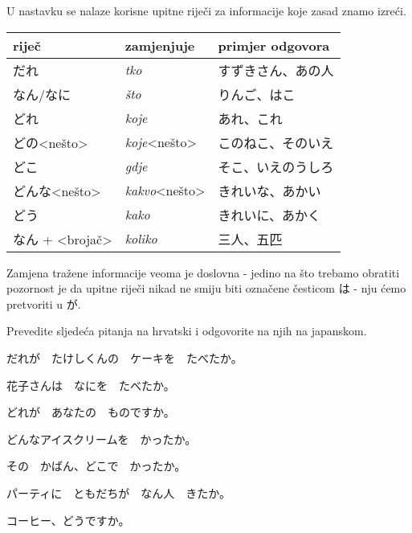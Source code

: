 	U nastavku se nalaze korisne upitne riječi za informacije koje zasad znamo izreći.
	
	\vspace{10pt}
	\begin{table}[h]
		\centering
		\begin{tabular}{l l l}\toprule[2pt]
			riječ & zamjenjuje & primjer odgovora\\
			\midrule
			だれ & \textit{tko} & すずきさん、あの人\\
			なん/なに & \textit{što} & りんご、はこ\\
			どれ & \textit{koje} & あれ、これ\\
			どの<nešto> & \textit{koje}<nešto> & このねこ、そのいえ\\
			どこ & \textit{gdje} & そこ、いえのうしろ\\
			どんな<nešto> & \textit{kakvo}<nešto> & きれいな、あかい\\
			どう & \textit{kako} & きれいに、あかく\\
			なん + <brojač> & \textit{koliko} & 三人、五匹\\
			\bottomrule
		\end{tabular}
	\end{table}

	\vspace{5pt}
	Zamjena tražene informacije veoma je doslovna - jedino na što trebamo obratiti pozornost je da upitne riječi nikad ne smiju biti označene česticom は - nju ćemo pretvoriti u が.

	
	\begin{mondai}{Prevedite sljedeća pitanja na hrvatski i odgovorite na njih na japanskom.}
		\item だれが　たけしくんの　ケーキを　たべたか。
		\item 花子さんは　なにを　たべたか。
		\item どれが　あなたの　ものですか。
		\item どんなアイスクリームを　かったか。
		\item その　かばん、どこで　かったか。
		\item パーティに　ともだちが　なん人　きたか。
		\item コーヒー、どうですか。
	\end{mondai}
